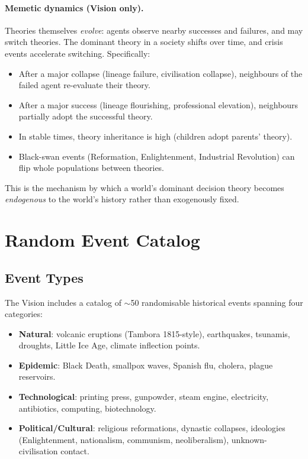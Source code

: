 \paragraph{Memetic dynamics (Vision only).}
Theories themselves \emph{evolve}: agents observe nearby successes and
failures, and may switch theories. The dominant theory in a society
shifts over time, and crisis events accelerate switching. Specifically:

\begin{itemize}
\item After a major collapse (lineage failure, civilisation collapse),
neighbours of the failed agent re-evaluate their theory.
\item After a major success (lineage flourishing, professional
elevation), neighbours partially adopt the successful theory.
\item In stable times, theory inheritance is high (children adopt
parents' theory).
\item Black-swan events (Reformation, Enlightenment, Industrial
Revolution) can flip whole populations between theories.
\end{itemize}

This is the mechanism by which a world's dominant decision theory
becomes \emph{endogenous} to the world's history rather than
exogenously fixed.

\section{Random Event Catalog}
\label{sec:vision-events}

\subsection{Event Types}
\label{sec:vision-event-types}

The Vision includes a catalog of $\sim$50 randomisable historical
events spanning four categories:

\begin{itemize}
\item \textbf{Natural}: volcanic eruptions (Tambora 1815-style),
earthquakes, tsunamis, droughts, Little Ice Age, climate inflection
points.
\item \textbf{Epidemic}: Black Death, smallpox waves, Spanish flu,
cholera, plague reservoirs.
\item \textbf{Technological}: printing press, gunpowder, steam engine,
electricity, antibiotics, computing, biotechnology.
\item \textbf{Political/Cultural}: religious reformations, dynastic
collapses, ideologies (Enlightenment, nationalism, communism,
neoliberalism), unknown-civilisation contact.
\end{itemize}

